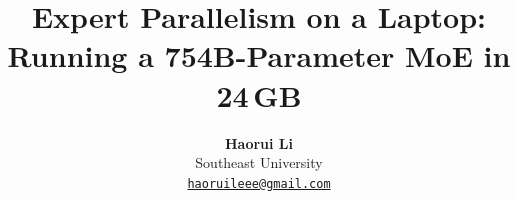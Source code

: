 \documentclass{article}
\title{Expert Parallelism on a Laptop:\\Running a 754B-Parameter MoE in 24\,GB}
\author{%
\textbf{Haorui Li}\\
Southeast University\\
\href{mailto:haoruileee@gmail.com}{\texttt{haoruileee@gmail.com}}
}
\begin{document}
\maketitle
\lhead{} %









\label{lastmainpage}
\clearpage


\clearpage


\clearpage
\appendix

\end{document}
